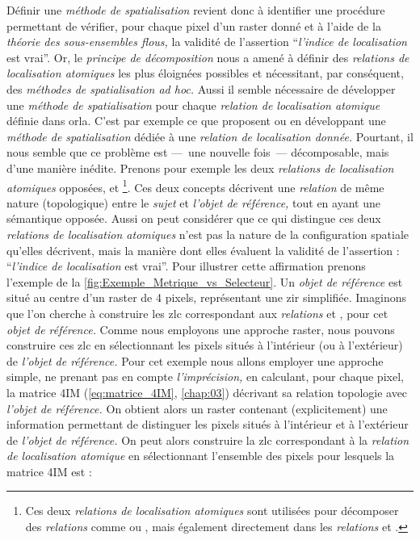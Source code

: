 Définir une \emph{méthode de spatialisation} revient donc à identifier une procédure permettant de vérifier, pour chaque pixel d'un raster donné et à l'aide de la \emph{théorie des sous-ensembles flous,} la validité de l'assertion \enquote{\emph{l'indice de localisation} est vrai}. Or, le \emph{principe de décomposition} nous a amené à définir des \emph{relations de localisation atomiques} les plus éloignées possibles et nécessitant, par conséquent, des \emph{méthodes de spatialisation ad hoc.} Aussi il semble nécessaire de développer une \emph{méthode de spatialisation} pour chaque \emph{relation de localisation atomique} définie dans \ac{orla}. C'est par exemple ce que proposent \textcite{Vanegas2011} ou \textcite{Takemura2012} en développant une \emph{méthode de spatialisation} dédiée à une \emph{relation de localisation donnée.} Pourtant, il nous semble que ce problème est ---~une nouvelle fois~--- décomposable, mais d'une manière inédite. Prenons pour exemple les deux \emph{relations de localisation atomiques} opposées,  et  \footnote{Ces deux \emph{relations de localisation atomiques} sont utilisées pour décomposer des \emph{relations} comme \protect{} ou \protect{}, mais également directement dans les \emph{relations} \protect{} et \protect{}.}. Ces deux concepts décrivent une \emph{relation} de même nature (\ie topologique) entre le \emph{sujet} et \emph{l'objet de référence,} tout en ayant une sémantique opposée. Aussi on peut considérer que ce qui distingue ces deux \emph{relations de localisation atomiques} n'est pas la nature de la configuration spatiale qu'elles décrivent, mais la manière dont elles évaluent la validité de l'assertion : \enquote{\emph{l'indice de localisation} est vrai}. Pour illustrer cette affirmation prenons l'exemple de la \autoref{fig:Exemple_Metrique_vs_Selecteur}. Un \emph{objet de référence} est situé au centre d'un raster de 4 pixels, représentant une \ac{zir} simplifiée. Imaginons que l'on cherche à construire les \ac{zlc} correspondant aux \emph{relations}  et , pour cet \emph{objet de référence.} Comme nous employons une approche raster, nous pouvons construire ces \ac{zlc} en sélectionnant les pixels situés à l'intérieur (ou à l'extérieur) de \emph{l'objet de référence.} Pour cet exemple nous allons employer une approche simple, ne prenant pas en compte \emph{l'imprécision,} en calculant, pour chaque pixel, la matrice 4IM (\autoref{eq:matrice_4IM}, \autoref{chap:03}) décrivant sa relation topologie avec \emph{l'objet de référence.} On obtient alors un raster contenant (explicitement) une information permettant de distinguer les pixels situés à l'intérieur et à l'extérieur de \emph{l'objet de référence.} On peut alors construire la \ac{zlc} correspondant à la \emph{relation de localisation atomique}  en sélectionnant l'ensemble des pixels pour lesquels la matrice 4IM est : 